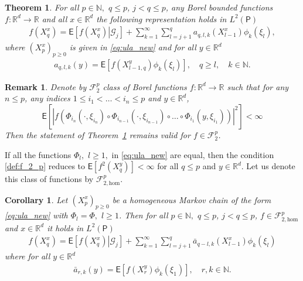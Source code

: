 \documentclass[bj]{imsart}
\def\PE{\mathsf{E}}
\def\nset{\mathbb{N}}
\def\rset{\mathbb{R}}
\def\rset{\mathbb{R}}
\newtheorem{thm}{Theorem}
\newtheorem{remark}{Remark}
\newtheorem{cor}{Corollary}
\begin{document}
\begin{thm}\label{thm:main-repr}
For all $p \in \nset,$ $q \leq p$, $j < q \leq p$, any Borel bounded functions $f: \rset^d \rightarrow \rset$ and all $x \in \rset^d$ the following representation holds in \(L^2(\mathsf{P})\)
\begin{eqnarray}
\label{eq:mart_repr}
f(X^x_{q})=\mathsf{E}\left[\left.f(X^x_{q})\right|\mathcal G_{j}\right]+\sum_{k=1}^{\infty}\sum_{l=j+1}^{q}a_{q,l,k}(X^x_{l-1})\phi_k\left(\xi_{l}\right),
\end{eqnarray}
where \((X^x_{p})_{p\geq 0}\) is given in \eqref{eq:ula_new} and for all $y \in \rset^d$
\begin{eqnarray}
\label{eq:coeff_mart}
a_{q,l,k}(y)=\mathsf{E}\left[f(X^y_{l-1,q})\phi_k\left(\xi_{l}\right)\right], \quad q\geq l, \quad k\in \nset.
\end{eqnarray}
\end{thm}


\begin{remark}\label{rem:general_moments} Denote by $\mathcal{F}_2^p$ class of Borel functions $f: \rset^d \to \rset$ such that for any $n \leq p$, any indices $1 \leq i_1 < \ldots < i_n \leq p$ and $y \in \rset^d$,
\begin{equation}
\label{def:f_2_p}
\mathsf{E}\left[\left |f(\Phi_{i_n}(\cdot,\xi_{i_n})\circ\Phi_{i_{n-1}}(\cdot,\xi_{i_{n-1}})\circ\dots\circ\Phi_{i_{1}}(y,\xi_{i_{1}}))\right|^{2}\right]<\infty
\end{equation}
Then the statement of Theorem~\ref{thm:main-repr} remains valid for $f \in \mathcal{F}_2^p$. 
\end{remark}

If  all the functions $\Phi_l,$ $l\geq 1,$ in \eqref{eq:ula_new} are equal, then the condition \eqref{def:f_2_p} reduces to $\PE \left[ f^2(X_q^y)\right] < \infty$ for all $q \leq p$ and $y \in \rset^d$. Let us denote this class of functions by $\mathcal{F}_{2,\text{hom}}^p$.

\begin{cor}
Let \((X^x_{p})_{p\geq 0}\) be a homogeneous Markov chain of the form \eqref{eq:ula_new} with $\Phi_l = \Phi,$ $l\geq 1$. Then for all $p \in \nset,$ $q \leq p$, $j < q \leq p$, $f \in \mathcal{F}_{2,\text{hom}}^p$ and $x \in \rset^d$ it holds in \(L^2(\mathsf{P})\)
\begin{eqnarray*}
f(X^x_{q})=\mathsf{E}\left[\left.f(X^x_{q})\right|\mathcal G_{j}\right]+\sum_{k=1}^{\infty}\sum_{l=j+1}^{q}\bar a_{q-l,k}(X^x_{l-1})\phi_k\left(\xi_{l}\right)
\end{eqnarray*}
where for all $y \in \rset^d$
\begin{eqnarray*}
\bar a_{r,k}(y)=\mathsf{E}\left[f(X^y_{r})\phi_k\left(\xi_{1}\right)\right], \quad r, k\in \mathbb{N}.
\end{eqnarray*}
\end{cor}
\end{document}
